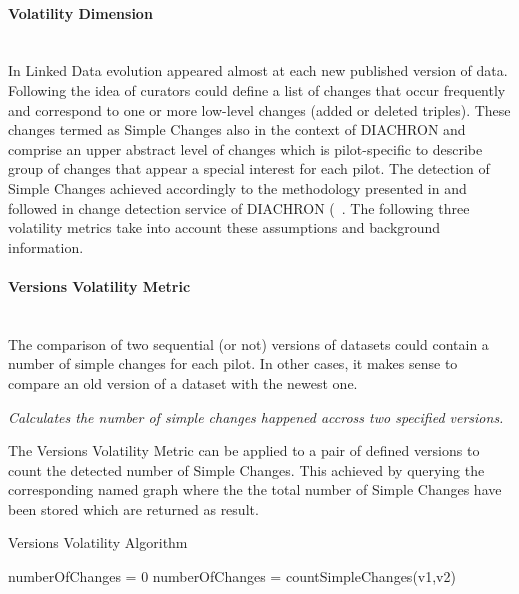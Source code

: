 
\paragraph{Volatility Dimension}~\\ %
In Linked Data evolution appeared almost at each new published version of data. Following the idea of \cite{TODS13} curators could define a list of changes that occur frequently and correspond to one or more low-level changes (added or deleted triples). These changes termed as Simple Changes also in the context of DIACHRON and comprise an upper abstract level of changes which is pilot-specific to describe group of changes that appear a special interest for each pilot. The detection of Simple Changes achieved accordingly to the methodology presented in \cite{TODS13} and followed in change detection service of DIACHRON (~\cite{D3.1}. The following three volatility metrics take into account these assumptions and background information.

\paragraph{Versions Volatility Metric} ~\\ %
The comparison of two sequential (or not) versions of datasets could contain a number of simple changes for each pilot. In other cases, it makes sense to compare an old version of a dataset with the newest one. 

\begin{mdframed}[style=metricdefinition]
\emph{Calculates the number of simple changes happened accross two specified versions.}
\end{mdframed}

The Versions Volatility Metric can be applied to a pair
of defined versions to count the detected number of Simple Changes. This achieved by querying the corresponding named graph where the the total number of Simple Changes have been stored which are returned as result. 

\begin{algorithm}
\caption{Versions Volatility Algorithm}
\begin{algorithmic}[1]
\State numberOfChanges = 0
\EndProcedure
{}
\State numberOfChanges = countSimpleChanges(v1,v2)
\EndProcedure
\State {}
\end{algorithmic}
\end{algorithm}

